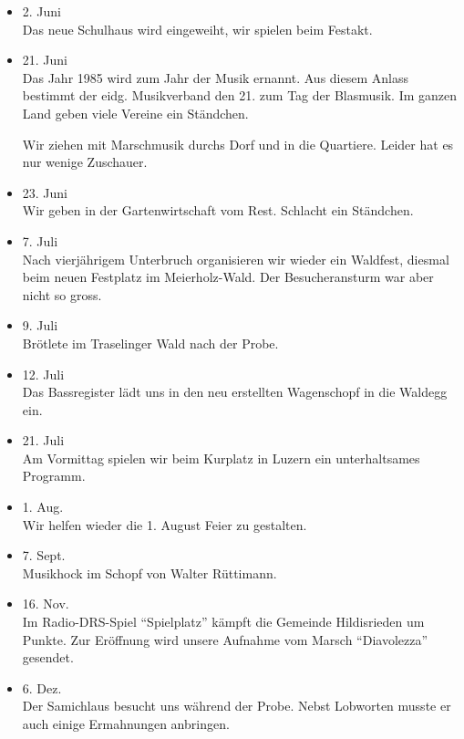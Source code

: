 \begin{history}
\begin{itemize}
        \item 2. Juni\\
              Das neue Schulhaus wird eingeweiht, wir spielen beim Festakt.

        \item 21. Juni\\
              Das Jahr 1985 wird zum Jahr der Musik ernannt. Aus diesem Anlass
              bestimmt der eidg. Musikverband den 21. zum Tag der Blasmusik. Im ganzen
              Land geben viele Vereine ein Ständchen.

              Wir ziehen mit Marschmusik durchs Dorf und in die Quartiere. Leider hat
              es nur wenige Zuschauer.

        \item 23. Juni\\
              Wir geben in der Gartenwirtschaft vom Rest. Schlacht ein Ständchen.

        \item 7. Juli\\
              Nach vierjährigem Unterbruch organisieren wir wieder ein Waldfest,
              diesmal beim neuen Festplatz im Meierholz-Wald. Der Besucheransturm war
              aber nicht so gross.

        \item 9. Juli\\
              Brötlete im Traselinger Wald nach der Probe.

        \item 12. Juli\\
              Das Bassregister lädt uns in den neu erstellten Wagenschopf in die
              Waldegg ein.

        \item 21. Juli\\
              Am Vormittag spielen wir beim Kurplatz in Luzern ein unterhaltsames
              Programm.

        \item 1. Aug.\\
              Wir helfen wieder die 1. August Feier zu gestalten.

        \item 7. Sept.\\
              Musikhock im Schopf von Walter Rüttimann.

        \item 16. Nov.\\
              Im Radio-DRS-Spiel \enquote{Spielplatz} kämpft die Gemeinde Hildisrieden
              um Punkte. Zur Eröffnung wird unsere Aufnahme vom Marsch
              \enquote{Diavolezza} gesendet.

        \item 6. Dez.\\
              Der Samichlaus besucht uns während der Probe. Nebst Lobworten musste er
              auch einige Ermahnungen anbringen.

    \end{itemize}

\end{history}
